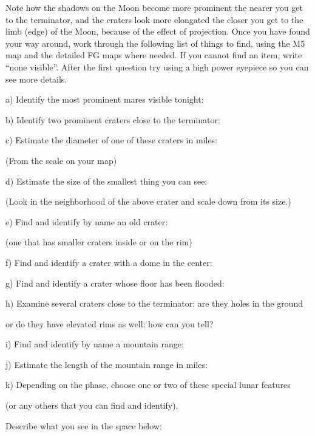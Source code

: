 \documentclass[12pt]{article}
\begin{document}
Note how the shadows on the Moon become more prominent the nearer you
get to the terminator, and the craters look more elongated the closer
you get to the limb (edge) of the Moon, because of the effect of
projection. Once you have found your way around, work through the
following list of things to find, using the M5 map and the detailed FG
maps where needed.  If you cannot find an item, write
``none visible''. After the first question try using
a high power eyepiece so you can see more details.

\bigskip 

a) Identify the most prominent mares visible tonight: \hfill
\makebox[4cm]{\hrulefill}

\medskip
b) Identify two prominent craters close to the terminator: \hfill
\makebox[4cm]{\hrulefill}

\medskip
c) Estimate the diameter of one of these craters in miles:\hfill
\makebox[4cm]{\hrulefill}

(From the scale on your map)

\medskip
d) Estimate the size of the smallest thing you can see: \hfill
\makebox[4cm]{\hrulefill}

(Look in the neighborhood of the above crater and scale down from its size.)

\medskip
e) Find and identify by name an old crater: \hfill
\makebox[4cm]{\hrulefill}

(one that has smaller craters inside or on the rim)

\medskip
f) Find and identify a crater with a dome in the center: \hfill \makebox[4cm]{\hrulefill}

\medskip
g) Find and identify a crater whose floor has been flooded:
\hfill \makebox[4cm]{\hrulefill}


\medskip
h) Examine several craters close to the terminator: are they holes in
the ground 

or do they have elevated rims as well: how can you tell? 
\hfill \makebox[4cm]{\hrulefill}

\medskip
i) Find and identify by name a mountain range: \hfill
\makebox[4cm]{\hrulefill}


\medskip
j) Estimate the length of the mountain range in miles: \hfill
\makebox[4cm]{\hrulefill}


\medskip
k) Depending on the phase, choose one or two of these special lunar
features 

(or any others that you can find and identify).

Describe what you see in the space below: 
\end{document}
